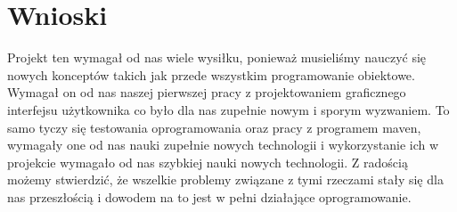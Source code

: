 \documentclass[10pt, a4paper]{report}
\begin{document}
\section{Wnioski}\label{sec:wnioski}
Projekt ten wymagał od nas wiele wysiłku, ponieważ musieliśmy nauczyć się nowych konceptów takich jak przede wszystkim
programowanie obiektowe. Wymagał on od nas naszej pierwszej pracy z projektowaniem graficznego interfejsu użytkownika co było dla nas zupełnie nowym i sporym wyzwaniem.
To samo tyczy się testowania oprogramowania oraz pracy z programem maven, wymagały one od nas nauki zupełnie nowych technologii i wykorzystanie ich w projekcie wymagało od nas
szybkiej nauki nowych technologii. Z radością możemy stwierdzić, że wszelkie problemy związane z tymi rzeczami stały się dla nas przeszłością i dowodem na to jest w pełni działające
oprogramowanie.
\end{document}
